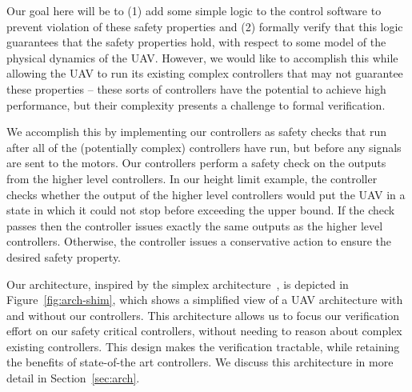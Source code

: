 Our goal here will be to (1) add some simple logic to the control software
to prevent violation of these safety properties and (2) formally verify
that this logic guarantees that the safety properties hold, with respect to
some model of the physical dynamics of the UAV.  However, we would like to
accomplish this while allowing the UAV to run its existing complex
controllers that may not guarantee these properties -- these sorts of
controllers have the potential to achieve high performance, but their
complexity presents a challenge to formal verification.

We accomplish this by implementing our controllers as safety checks that
run after all of the (potentially complex) controllers have run, but before
any signals are sent to the motors.  Our controllers perform a safety check
on the outputs from the higher level controllers.  In our height limit
example, the controller checks whether the output of the higher level
controllers would put the UAV in a state in which it could not stop before
exceeding the upper bound.  If the check passes then the controller issues
exactly the same outputs as the higher level controllers.  Otherwise, the
controller issues a conservative action to ensure the desired safety
property.

Our architecture, inspired by the simplex
architecture~\cite{sha1996evolving}, is depicted in
Figure~\ref{fig:arch-shim}, which shows a simplified view of a UAV
architecture with and without our controllers.  This architecture allows us
to focus our verification effort on our safety critical controllers,
without needing to reason about complex existing controllers.  This design
makes the verification tractable, while retaining the benefits of
state-of-the art controllers. We discuss this architecture in more detail
in Section~\ref{sec:arch}.

